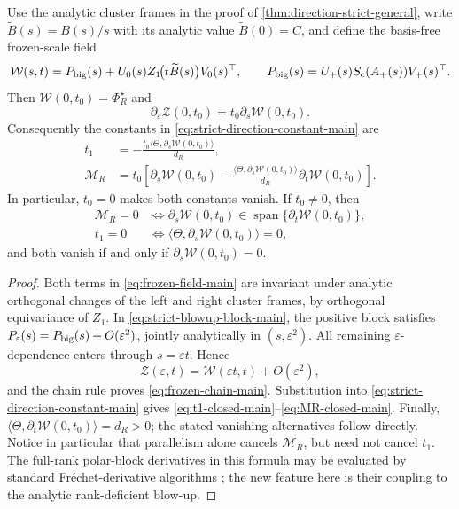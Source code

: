 \begin{proposition}
\label{prop:strict-constants-closed-main}
Use the analytic cluster frames in the proof of
\cref{thm:direction-strict-general}, write
\(\widetilde B(s)=B(s)/s\) with its analytic value
\(\widetilde B(0)=C\), and define the basis-free frozen-scale field
\begin{equation}
 \mathcal W(s,t)=P_{\rm big}(s)
 +U_0(s)Z_1\!\bigl(t\widetilde B(s)\bigr)V_0(s)^\top,
 \qquad
 P_{\rm big}(s)=U_+(s)S_{\mathrm c}(A_+(s))V_+(s)^\top.
 \label{eq:frozen-field-main}
\end{equation}
Then \(\mathcal W(0,t_0)=\Phi_R^\star\) and
\begin{equation}
 \partial_\varepsilon\mathcal Z(0,t_0)
 =t_0\partial_s\mathcal W(0,t_0).
 \label{eq:frozen-chain-main}
\end{equation}
Consequently the constants in
\eqref{eq:strict-direction-constant-main} are
\begin{align}
 t_1&=-\frac{t_0
 \langle\Theta,\partial_s\mathcal W(0,t_0)\rangle}{d_R},
 \label{eq:t1-closed-main}\\
 \mathcal M_R&=t_0\left[
 \partial_s\mathcal W(0,t_0)
 -\frac{\langle\Theta,\partial_s\mathcal W(0,t_0)\rangle}{d_R}
  \partial_t\mathcal W(0,t_0)
 \right].
 \label{eq:MR-closed-main}
\end{align}
In particular, \(t_0=0\) makes both constants vanish.  If \(t_0\ne0\),
then
\begin{align*}
 \mathcal M_R=0
 &\iff \partial_s\mathcal W(0,t_0)
       \in\operatorname{span}\{\partial_t\mathcal W(0,t_0)\},\\
 t_1=0
 &\iff \langle\Theta,\partial_s\mathcal W(0,t_0)\rangle=0,
\end{align*}
and both vanish if and only if
\(\partial_s\mathcal W(0,t_0)=0\).
\end{proposition}

\begin{proof}
Both terms in \eqref{eq:frozen-field-main} are invariant under analytic
orthogonal changes of the left and right cluster frames, by orthogonal
equivariance of \(Z_1\).  In \eqref{eq:strict-blowup-block-main}, the positive
block satisfies
\(P_\varepsilon(s)=P_{\rm big}(s)+O(\varepsilon^2)\), jointly analytically
in \((s,\varepsilon^2)\).  All remaining \(\varepsilon\)-dependence enters
through \(s=\varepsilon t\).  Hence
\[
 \mathcal Z(\varepsilon,t)
 =\mathcal W(\varepsilon t,t)+O(\varepsilon^2),
\]
and the chain rule proves \eqref{eq:frozen-chain-main}.  Substitution into
\eqref{eq:strict-direction-constant-main} gives
\eqref{eq:t1-closed-main}--\eqref{eq:MR-closed-main}.  Finally,
\(\langle\Theta,\partial_t\mathcal W(0,t_0)\rangle=d_R>0\);
the stated vanishing alternatives follow directly.  Notice in particular
that parallelism alone cancels \(\mathcal M_R\), but need not cancel \(t_1\).
The full-rank polar-block derivatives in this formula may be evaluated by
standard Fr\'echet-derivative algorithms \citep{gawlik2017frechet}; the new
feature here is their coupling to the analytic rank-deficient blow-up.
\end{proof}

